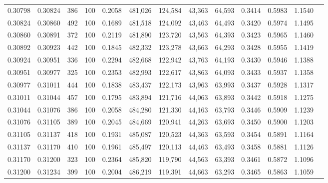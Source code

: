 \begin{tabular}{rrrrrrrrrrrrr}
0.30798 & 0.30824 &   386 & 100 &                                     0.2058 & 481,026 & 124,584 &  43,363 &  64,593 & 0.3414 & 0.5983 & 1.1540 \\
0.30824 & 0.30860 &   492 & 100 &                                     0.1689 & 481,518 & 124,092 &  43,463 &  64,493 & 0.3420 & 0.5974 & 1.1495 \\
0.30860 & 0.30891 &   372 & 100 &                                     0.2119 & 481,890 & 123,720 &  43,563 &  64,393 & 0.3423 & 0.5965 & 1.1460 \\
0.30892 & 0.30923 &   442 & 100 &                                     0.1845 & 482,332 & 123,278 &  43,663 &  64,293 & 0.3428 & 0.5955 & 1.1419 \\
0.30924 & 0.30951 &   336 & 100 &                                     0.2294 & 482,668 & 122,942 &  43,763 &  64,193 & 0.3430 & 0.5946 & 1.1388 \\
0.30951 & 0.30977 &   325 & 100 &                                     0.2353 & 482,993 & 122,617 &  43,863 &  64,093 & 0.3433 & 0.5937 & 1.1358 \\
0.30977 & 0.31011 &   444 & 100 &                                     0.1838 & 483,437 & 122,173 &  43,963 &  63,993 & 0.3437 & 0.5928 & 1.1317 \\
0.31011 & 0.31044 &   457 & 100 &                                     0.1795 & 483,894 & 121,716 &  44,063 &  63,893 & 0.3442 & 0.5918 & 1.1275 \\
0.31044 & 0.31076 &   386 & 100 &                                     0.2058 & 484,280 & 121,330 &  44,163 &  63,793 & 0.3446 & 0.5909 & 1.1239 \\
0.31076 & 0.31105 &   389 & 100 &                                     0.2045 & 484,669 & 120,941 &  44,263 &  63,693 & 0.3450 & 0.5900 & 1.1203 \\
0.31105 & 0.31137 &   418 & 100 &                                     0.1931 & 485,087 & 120,523 &  44,363 &  63,593 & 0.3454 & 0.5891 & 1.1164 \\
0.31137 & 0.31170 &   410 & 100 &                                     0.1961 & 485,497 & 120,113 &  44,463 &  63,493 & 0.3458 & 0.5881 & 1.1126 \\
0.31170 & 0.31200 &   323 & 100 &                                     0.2364 & 485,820 & 119,790 &  44,563 &  63,393 & 0.3461 & 0.5872 & 1.1096 \\
0.31200 & 0.31234 &   399 & 100 &                                     0.2004 & 486,219 & 119,391 &  44,663 &  63,293 & 0.3465 & 0.5863 & 1.1059 \\

\end{tabular}
